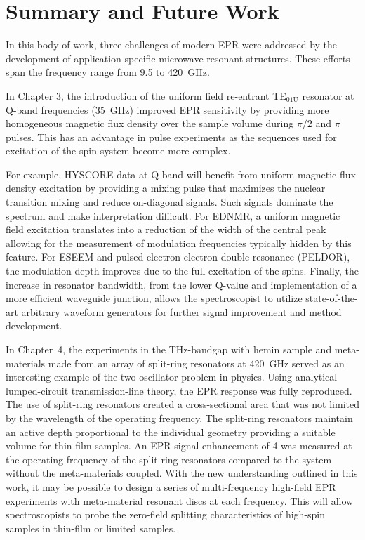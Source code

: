 \chapter[Summary and Future Work]{Summary and Future Work}

In this body of work, three challenges of modern EPR were addressed by the development of application-specific microwave resonant structures. These efforts span the frequency range from 9.5 to 420~GHz.

In Chapter 3, the introduction of the uniform field re-entrant TE$_{\text{01U}}$ resonator at Q-band frequencies (35~GHz) improved EPR sensitivity by providing more homogeneous magnetic flux density over the sample volume during $\pi/2$ and $\pi$ pulses. This has an advantage in pulse experiments as the sequences used for excitation of the spin system become more complex. 

For example, HYSCORE data at Q-band will benefit from uniform magnetic flux density excitation by providing a mixing pulse that maximizes the nuclear transition mixing and reduce on-diagonal signals. \cite{Doorslaer2007,Harmer2009} Such signals dominate the spectrum and make interpretation difficult. For EDNMR, a uniform magnetic field excitation translates into a reduction of the width of the central peak allowing for the measurement of modulation frequencies typically hidden by this feature. \cite{NicholasCox2013} For ESEEM and pulsed electron electron double resonance (PELDOR), the modulation depth improves due to the full excitation of the spins. Finally, the increase in resonator bandwidth, from the lower Q-value and implementation of a more efficient waveguide junction, allows the spectroscopist to utilize state-of-the-art arbitrary waveform generators for further signal improvement and method development. \cite{DOLL201327,dSegawa2015,SPINDLER201730,WILI201826,PRISNER201998}

In Chapter~4, the experiments in the THz-bandgap with hemin sample and meta-materials made from an array of split-ring resonators at 420~GHz served as an interesting example of the two oscillator problem in physics. Using analytical lumped-circuit transmission-line theory, the EPR response was fully reproduced. The use of split-ring resonators created a cross-sectional area that was not limited by the wavelength of the operating frequency. The split-ring resonators maintain an active depth proportional to the individual geometry providing a suitable volume for thin-film samples. An EPR signal enhancement of 4 was measured at the operating frequency of the split-ring resonators compared to the system without the meta-materials coupled. With the new understanding outlined in this work, it may be possible to design a series of multi-frequency high-field EPR experiments with meta-material resonant discs at each frequency. This will allow spectroscopists to probe the zero-field splitting characteristics of high-spin samples in thin-film or limited samples.

